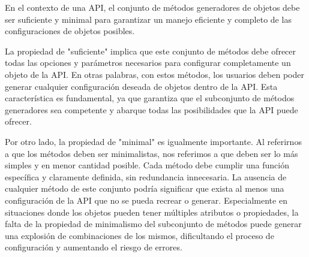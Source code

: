 


En el contexto de una API, el conjunto de métodos generadores de objetos debe ser suficiente y minimal para garantizar un manejo eficiente y completo de las configuraciones de objetos posibles.

La propiedad de "suficiente" implica que este conjunto de métodos debe ofrecer todas las opciones y parámetros necesarios para configurar completamente un objeto de la API. En otras palabras, con estos métodos, los usuarios deben poder generar cualquier configuración deseada de objetos dentro de la API. Esta característica es fundamental, ya que garantiza que el subconjunto de métodos generadores sea competente y abarque todas las posibilidades que la API puede ofrecer.

Por otro lado, la propiedad de "minimal" es igualmente importante. Al referirnos a que los métodos deben ser minimalistas, nos referimos a que deben ser lo más simples y en menor cantidad posible. Cada método debe cumplir una función específica y claramente definida, sin redundancia innecesaria. La ausencia de cualquier método de este conjunto podría significar que exista al menos una configuración de la API que no se pueda recrear o generar. Especialmente en situaciones donde los objetos pueden tener múltiples atributos o propiedades, la falta de la propiedad de minimalismo del subconjunto de métodos puede generar una explosión de combinaciones de los mismos, dificultando el proceso de configuración y aumentando el riesgo de errores.



